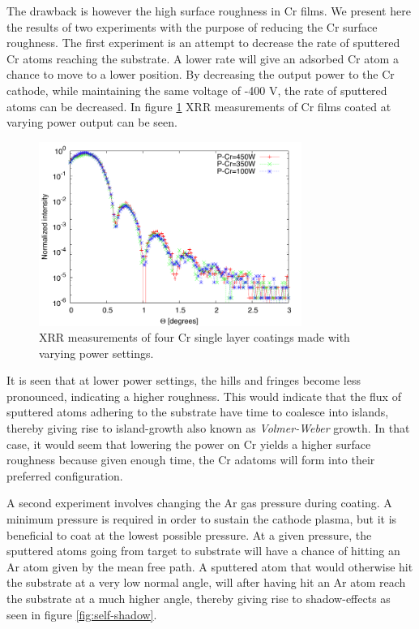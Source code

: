 The drawback is however the high surface roughness in Cr films. We present here the results of two experiments with the purpose of reducing the Cr surface roughness. The first experiment is an attempt to decrease the rate of sputtered Cr atoms reaching the substrate. A lower rate will give an adsorbed Cr atom a chance to move to a lower position\cite{Venables:1984wu}. By decreasing the output power to the Cr cathode, while maintaining the same voltage of -400 V, the rate of sputtered atoms can be decreased. In figure \ref{fig:cr-power-change} XRR measurements of Cr films coated at varying power output can be seen.

\begin{figure}[!h]
	\center
	\includegraphics[height=6cm]{figures/athena/coatings/cr-power-change.pdf}
\caption{\footnotesize XRR measurements of four Cr single layer coatings made with varying power settings.}\label{fig:cr-power-change}
\end{figure}

It is seen that at lower power settings, the hills and fringes become less pronounced, indicating a higher roughness. This would indicate that the flux of sputtered atoms adhering to the substrate have time to coalesce into islands, thereby giving rise to island-growth also known as \emph{Volmer-Weber} growth\cite{Thompson:2000ge}. In that case, it would seem that lowering the power on Cr yields a higher surface roughness because given enough time, the Cr adatoms will form into their preferred configuration.

A second experiment involves changing the Ar gas pressure during coating. A minimum pressure is required in order to sustain the cathode plasma, but it is beneficial to coat at the lowest possible pressure. At a given pressure, the sputtered atoms going from target to substrate will have a chance of hitting an Ar atom given by the mean free path. A sputtered atom that would otherwise hit the substrate at a very low normal angle, will after having hit an Ar atom reach the substrate at a much higher angle, thereby giving rise to shadow-effects\cite{Barabasi:XbjHWFWZ} as seen in figure \ref{fig:self-shadow}.

